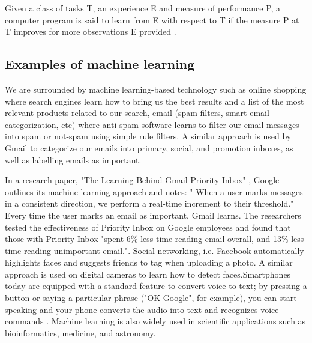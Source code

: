 Given a class of tasks T, an experience E and measure of performance P, a computer program is said to learn from E with respect to T if the measure P at T improves for more observations E provided \citep{michalski2013machine}. 
\subsection{Examples of machine learning}
We are surrounded by machine learning-based technology such as online shopping where  search engines learn how to bring us the best results and a list of the most relevant products related to our search, email (spam filters, smart email categorization, etc)  where anti-spam software
learns to filter our email messages into spam or not-spam using simple rule filters. A similar approach is used by Gmail to categorize our emails into primary, social, and promotion inboxes, as well as labelling emails as important. 

In a research paper, "The Learning Behind Gmail Priority Inbox" \citep{aberdeen2010learning}, Google outlines its machine learning approach  and notes: " When a user marks messages in a consistent direction, we perform a real-time increment to their threshold." Every time the user marks an email as important, Gmail learns. The researchers tested the effectiveness of Priority Inbox on Google employees and found that those with Priority Inbox "spent 6\% less time reading email overall, and 13\% less time reading unimportant email.". Social networking, i.e. Facebook  automatically highlights faces and suggests friends to tag when uploading a photo. A similar approach is used on digital cameras to learn how to detect faces.Smartphones today are equipped with a standard feature to convert voice to text; by pressing a button or saying a particular phrase ("OK Google", for example), you can start speaking and your phone converts the audio into text and recognizes voice commands \citep{Techemergence}.  
Machine learning is also widely used in scientific applications such as bioinformatics, medicine, and astronomy.


